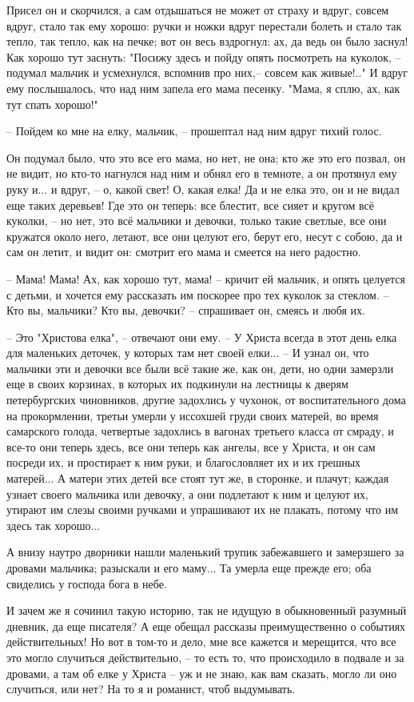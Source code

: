 \documentclass[a4paper, 12pt]{article}
\begin{document}
    Присел он и скорчился, а сам отдышаться не может от страху и вдруг, совсем вдруг, стало так ему хорошо: ручки и ножки вдруг перестали болеть и стало так тепло, так тепло, как на печке; вот он весь вздрогнул: ах, да ведь он было заснул! Как хорошо тут заснуть: "Посижу здесь и пойду опять посмотреть на куколок, -- подумал мальчик и усмехнулся, вспомнив про них,-- совсем как живые!.." И вдруг ему послышалось, что над ним запела его мама песенку. "Мама, я сплю, ах, как тут спать хорошо!" 
    
    -- Пойдем ко мне на елку, мальчик, -- прошептал над ним вдруг тихий голос. 
    
    Он подумал было, что это все его мама, но нет, не она; кто же это его позвал, он не видит, но кто-то нагнулся над ним и обнял его в темноте, а он протянул ему руку и... и вдруг, -- о, какой свет! О, какая елка! Да и не елка это, он и не видал еще таких деревьев! Где это он теперь: все блестит, все сияет и кругом всё куколки, -- но нет, это всё мальчики и девочки, только такие светлые, все они кружатся около него, летают, все они целуют его, берут его, несут с собою, да и сам он летит, и видит он: смотрит его мама и смеется на него радостно. 
    
    -- Мама! Мама! Ах, как хорошо тут, мама! -- кричит ей мальчик, и опять целуется с детьми, и хочется ему рассказать им поскорее про тех куколок за стеклом. -- Кто вы, мальчики? Кто вы, девочки? -- спрашивает он, смеясь и любя их. 
    
    -- Это "Христова елка", -- отвечают они ему. -- У Христа всегда в этот день елка для маленьких деточек, у которых там нет своей елки... -- И узнал он, что мальчики эти и девочки все были всё такие же, как он, дети, но одни замерзли еще в своих корзинах, в которых их подкинули на лестницы к дверям петербургских чиновников, другие задохлись у чухонок, от воспитательного дома на прокормлении, третьи умерли у иссохшей груди своих матерей, во время самарского голода, четвертые задохлись в вагонах третьего класса от смраду, и все-то они теперь здесь, все они теперь как ангелы, все у Христа, и он сам посреди их, и простирает к ним руки, и благословляет их и их грешных матерей... А матери этих детей все стоят тут же, в сторонке, и плачут; каждая узнает своего мальчика или девочку, а они подлетают к ним и целуют их, утирают им слезы своими ручками и упрашивают их не плакать, потому что им здесь так хорошо... 
    
    А внизу наутро дворники нашли маленький трупик забежавшего и замерзшего за дровами мальчика; разыскали и его маму... Та умерла еще прежде его; оба свиделись у господа бога в небе. 
    
    \vspace{3ex}
    
    И зачем же я сочинил такую историю, так не идущую в обыкновенный разумный дневник, да еще писателя? А еще обещал рассказы преимущественно о событиях действительных! Но вот в том-то и дело, мне все кажется и мерещится, что все это могло случиться действительно, -- то есть то, что происходило в подвале и за дровами, а там об елке у Христа -- уж и не знаю, как вам сказать, могло ли оно случиться, или нет? На то я и романист, чтоб выдумывать.
\end{document}
